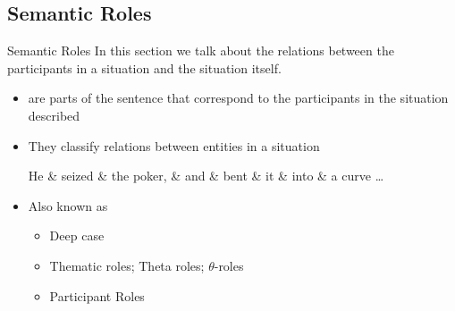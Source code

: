 \subsection{Semantic  Roles}
\begin{frame}{Semantic  Roles}
In this section we talk about the relations between the participants
in a situation and the situation itself.

\begin{itemize}
\item  {} are parts of the sentence that 
correspond to the participants in the situation 
described

\item  They classify relations between entities in a situation
\\[2ex] \begin{dependency}
\begin{deptext}[column sep=1em]
He \& seized \& the poker, \& and \& bent \& it \& into \& a curve \ldots \\ %
\end{deptext}
\end{dependency}
 \newpage
\item  Also known as
\begin{itemize}
\item  Deep case \citep{Fillmore:1968}
\item  Thematic roles; Theta roles;   $\theta$-roles
\item  Participant Roles
\end{itemize}
\end{itemize}
 
\end{frame}

